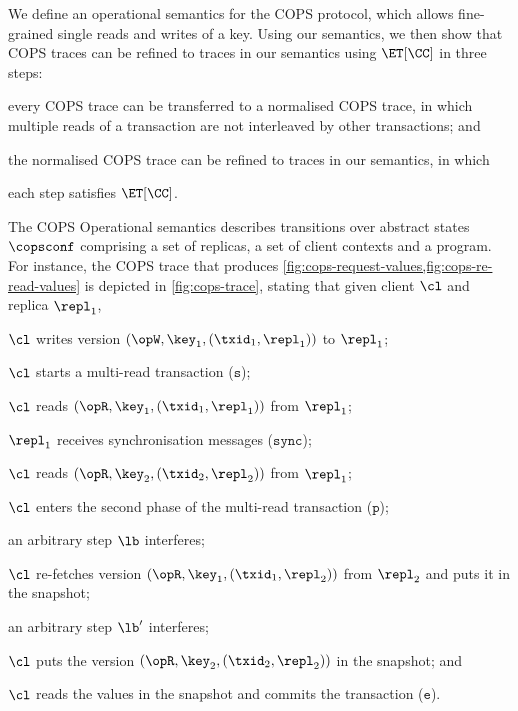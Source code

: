 We define an operational semantics for the COPS protocol, which allows fine-grained single reads and writes of a key.
Using our semantics, we then show that COPS traces can be refined to traces in our semantics using \( \ET[\CC] \) in three steps:
\begin{enumerate*}
	\item every COPS trace can be transferred to a normalised COPS trace, 
in which multiple reads of a transaction are not interleaved by other transactions; and
	\item the normalised COPS trace can be refined to traces in our semantics, in which 
	\item each step satisfies \( \ET[\CC] \).
\end{enumerate*}

The COPS Operational semantics
describes transitions over abstract states \( \copsconf \) comprising a set of replicas,
a set of client contexts and a program.
For instance, the COPS trace that produces \cref{fig:cops-request-values,fig:cops-re-read-values} is depicted in \cref{fig:cops-trace}, stating that
given client \(\cl\) and replica \( \repl_1 \),
\begin{enumerate*}
	\item \( \cl \) writes version \( (\opW,\key_1, (\txid_1,\repl_1)) \) to $\repl_1$;
	\item \( \cl \) starts a multi-read transaction (\( \mathtt{s} \));
	\item \( \cl \) reads \( (\opR,\key_1, (\txid_1,\repl_1)) \) from $\repl_1$;
	\item \( \repl_1 \) receives synchronisation messages (\(\mathtt{sync}\));
	\item \( \cl \) reads \( (\opR,\key_2, (\txid_2,\repl_2)) \) from $\repl_1$;
	\item \( \cl \) enters the second phase of the multi-read transaction (\(\mathtt{p}\));
	\item an arbitrary step \( \lb \) interferes;
	\item \( \cl \) re-fetches version \( (\opR,\key_1, (\txid_1,\repl_2)) \) from \( \repl_2 \) and puts it in the snapshot;
	\item an arbitrary step \( \lb' \) interferes;
	\item \( \cl \) puts the version \( (\opR,\key_2, (\txid_2,\repl_2)) \) in the snapshot; and
	\item \( \cl \) reads the values in the snapshot and commits the transaction (\(\mathtt{e}\)).
\end{enumerate*}


